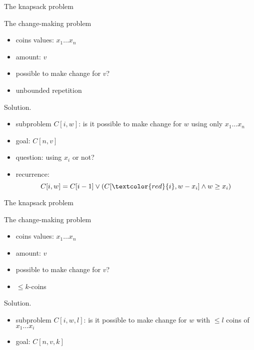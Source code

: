\begin{frame}{The knapsack problem}
  \begin{exampleblock}{The change-making problem }
    \begin{itemize}
      \item coins values: $x_{1} \dots x_{n}$
      \item amount: $v$
      \item possible to make change for $v$?
      \item unbounded repetition
    \end{itemize}
  \end{exampleblock}
  
  \begin{block}{Solution.}
    \begin{itemize}
      \item subproblem $C[i, w]$: is it possible to make change for $w$ using only $x_{1} \dots x_{n}$
      \item goal: $C[n,v]$
      \item question: using $x_{i}$ or not?
      \item recurrence:
	\[
	  C[i,w] = C[i-1] \lor (C[\textcolor{red}{i}, w-x_{i}] \land w \ge x_{i})
	\]
    \end{itemize}
  \end{block}
\end{frame}
\begin{frame}{The knapsack problem}
  \begin{exampleblock}{The change-making problem }
    \begin{itemize}
      \item coins values: $x_{1} \dots x_{n}$
      \item amount: $v$
      \item possible to make change for $v$?
      \item $\le k$-coins 
    \end{itemize}
  \end{exampleblock}

  \begin{block}{Solution.}
    \begin{itemize}
      \item subproblem $C[i,w,l]$: is it possible to make change for $w$ with $\le l$ coins of $x_{1} \dots x_{i}$
      \item goal: $C[n,v,k]$
    \end{itemize}
  \end{block}
\end{frame}
